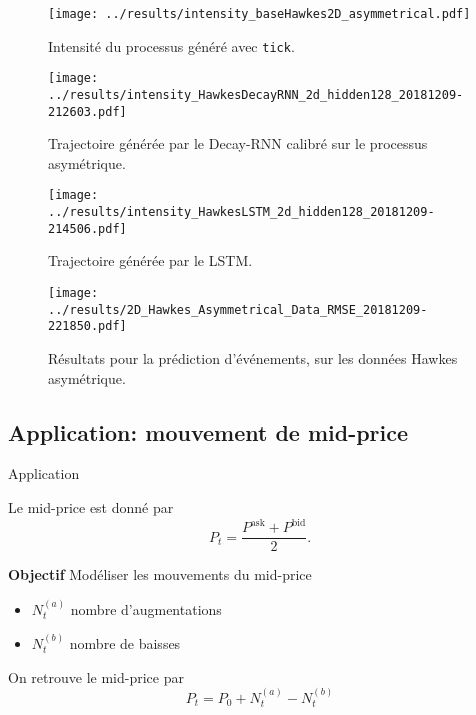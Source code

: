\documentclass[../main.tex]{subfiles}
\begin{document}
\begin{frame}
\begin{figure}
	\texttt{[image: ../results/intensity\_baseHawkes2D\_asymmetrical.pdf]}
	\caption{Intensité du processus généré avec \texttt{tick}.}
\end{figure}
\end{frame}

\begin{frame}
\begin{figure}
	\texttt{[image: ../results/intensity\_HawkesDecayRNN\_2d\_hidden128\_20181209-212603.pdf]}
	\caption{Trajectoire générée par le Decay-RNN calibré sur le processus asymétrique.}	
\end{figure}
\end{frame}

\begin{frame}
\begin{figure}
	\texttt{[image: ../results/intensity\_HawkesLSTM\_2d\_hidden128\_20181209-214506.pdf]}
	\caption{Trajectoire générée par le LSTM.}
\end{figure}
\end{frame}

\begin{frame}
\begin{figure}
	\texttt{[image: ../results/2D\_Hawkes\_Asymmetrical\_Data\_RMSE\_20181209-221850.pdf]}
	\caption{Résultats pour la prédiction d'événements, sur les données Hawkes asymétrique.}
\end{figure}
\end{frame}

\subsection{Application: mouvement de mid-price}

\begin{frame}{Application}

Le mid-price est donné par
\begin{equation*}
	P_t = \frac{P^\text{ask} + P^\text{bid}}{2}.
\end{equation*}

\textbf{Objectif} Modéliser les mouvements du mid-price

\begin{itemize}
	\item $N_t^{(a)}$ nombre d'augmentations
	\item $N_t^{(b)}$ nombre de baisses
\end{itemize}

On retrouve le mid-price par \autocite{2015arXiv150204592B}
\begin{equation}
	P_t = P_0 + N_t^{(a)} - N_t^{(b)}
\end{equation}

\end{frame}
\end{document}
